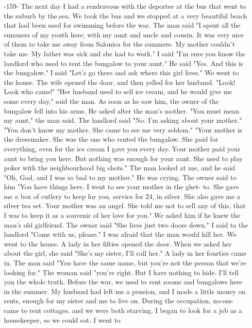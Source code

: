 -159- 
The next day I had a rendezvous with the deportee at the bus that went to the suburb by the.sea. We took the bus and we stopped at a very beautiful beach that had been 
used for swimming before the war. The man said "I spent all the summers of my youth 
here, with my aunt and uncle and cousin. It was very nice of them to take me away from 
Salonica for the summers. My mother couldn't take me. My father was sick and she had to 
work." 
I said "I'm sure you know the landlord who used to rent the bungalow to your aunt." 
He said "Yes. And this is the bungalow." 
I said "Let's go there and ask where this girl lives." 
We went to the house. The wife opened the door, and then yelled for her husband. 
"Look! Look who came!" 
"Her husband used to sell ice cream, and he would give me some every day," said the 
man. As soon as he saw him, the owner of the bungalow fell into his arms. He 
asked after the man's mother. 
"You must mean my aunt," the man said. 
The landlord said "No. I'm asking about your mother." 
"You don't know my mother. She came to see me very seldom." 
"Your mother is the dressmaker. She was the one who rented the bungalow. She paid 
for everything, even for the ice cream I gave you every day. Your mother paid your aunt 
to bring you here. But nothing was enough for your aunt. She used to play poker with 
the neighbourhood big shots." 
The man looked at me, and he said "Oh, God, and I was so bad to my mother." He was 
crying. 
The owner said to him "You have things here. I went to see your mother in the ghet-
to. She gave me a box of cutlery to keep for you, service for 24, in silver. She also 
gave me a silver tea set. Your mother was an angel. She told me not to sell any of 
this, that I was to keep it as a souvenir of her love for you." 
We asked him if he knew the man's old girlfriend. The owner said "She lives just 
two doors down." 
I said to the landlord "Come with us, please." I was afraid that the man would kill her. 
We went to the house. A lady in her fifties opened the door. When we asked her 
about the girl, she said "She's my sister, I'll call her." A lady in her fourties 
came in. The man said "You have the same name, but you're not the person that we're 
looking for." 
The woman said "you're right. But I have nothing to hide. I'll tell you the whole 
truth. Before the war, we used to rent rooms and bungalows here in the summer. My 
husband had left me a pension, and I made a little money on rents, enough for my sister 
and me to live on. During the occupation, no-one came to rent cottages, and we were 
both starving. I began to look for a job as a housekeeper, so we could eat. I went to 
